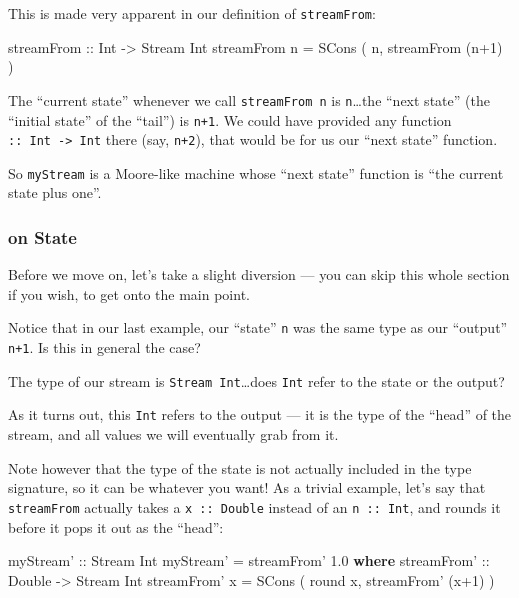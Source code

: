 \documentclass[]{article}
\newenvironment{Shaded}{}{}
\newcommand{\KeywordTok}[1]{\textcolor[rgb]{0.00,0.44,0.13}{\textbf{{#1}}}}
\newcommand{\DataTypeTok}[1]{\textcolor[rgb]{0.56,0.13,0.00}{{#1}}}
\newcommand{\DecValTok}[1]{\textcolor[rgb]{0.25,0.63,0.44}{{#1}}}
\newcommand{\FloatTok}[1]{\textcolor[rgb]{0.25,0.63,0.44}{{#1}}}
\newcommand{\OtherTok}[1]{\textcolor[rgb]{0.00,0.44,0.13}{{#1}}}
\newcommand{\FunctionTok}[1]{\textcolor[rgb]{0.02,0.16,0.49}{{#1}}}
\newcommand{\NormalTok}[1]{{#1}}
\begin{document}
This is made very apparent in our definition of \texttt{streamFrom}:

\begin{Shaded}
\begin{Highlighting}[]
\OtherTok{streamFrom ::} \DataTypeTok{Int} \OtherTok{->} \DataTypeTok{Stream} \DataTypeTok{Int}
\NormalTok{streamFrom n }\FunctionTok{=} \DataTypeTok{SCons} \NormalTok{( n, streamFrom (n}\FunctionTok{+}\DecValTok{1}\NormalTok{) )}
\end{Highlighting}
\end{Shaded}

The ``current state'' whenever we call \texttt{streamFrom\ n} is
\texttt{n}\ldots{}the ``next state'' (the ``initial state'' of the
``tail'') is \texttt{n+1}. We could have provided any function
\texttt{::\ Int\ -\textgreater{}\ Int} there (say, \texttt{n+2}), that
would be for us our ``next state'' function.

So \texttt{myStream} is a Moore-like machine whose ``next state''
function is ``the current state plus one''.

\subsubsection{on State}\label{on-state}

Before we move on, let's take a slight diversion --- you can skip this
whole section if you wish, to get onto the main point.

Notice that in our last example, our ``state'' \texttt{n} was the same
type as our ``output'' \texttt{n+1}. Is this in general the case?

The type of our stream is \texttt{Stream\ Int}\ldots{}does \texttt{Int}
refer to the state or the output?

As it turns out, this \texttt{Int} refers to the output --- it is the
type of the ``head'' of the stream, and all values we will eventually
grab from it.

Note however that the type of the state is not actually included in the
type signature, so it can be whatever you want! As a trivial example,
let's say that \texttt{streamFrom} actually takes a
\texttt{x\ ::\ Double} instead of an \texttt{n\ ::\ Int}, and rounds it
before it pops it out as the ``head'':

\begin{Shaded}
\begin{Highlighting}[]
\OtherTok{myStream' ::} \DataTypeTok{Stream} \DataTypeTok{Int}
\NormalTok{myStream' }\FunctionTok{=} \NormalTok{streamFrom' }\FloatTok{1.0}
  \KeywordTok{where}
\OtherTok{    streamFrom' ::} \DataTypeTok{Double} \OtherTok{->} \DataTypeTok{Stream} \DataTypeTok{Int}
    \NormalTok{streamFrom' x }\FunctionTok{=} \DataTypeTok{SCons} \NormalTok{( round x, streamFrom' (x}\FunctionTok{+}\DecValTok{1}\NormalTok{) )}
\end{Highlighting}
\end{Shaded}
\end{document}
